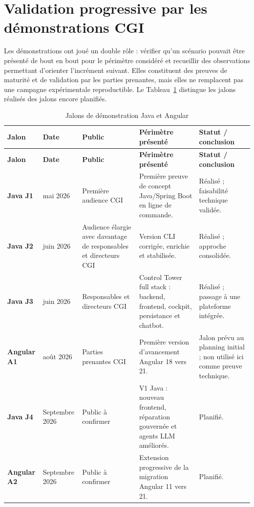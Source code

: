 \section{Validation progressive par les démonstrations CGI}

Les démonstrations ont joué un double rôle : vérifier qu'un scénario pouvait être présenté de bout en bout pour le périmètre considéré et recueillir des observations permettant d'orienter l'incrément suivant. Elles constituent des preuves de maturité et de validation par les parties prenantes, mais elles ne remplacent pas une campagne expérimentale reproductible. Le Tableau~\ref{tab:demonstrations-ch5} distingue les jalons réalisés des jalons encore planifiés.

\scriptsize
\begin{longtable}{|>{\bfseries\RaggedRight\arraybackslash}p{2cm}|>{\centering\arraybackslash}p{2.1cm}|>{\RaggedRight\arraybackslash}p{3.6cm}|>{\RaggedRight\arraybackslash}p{4.8cm}|>{\RaggedRight\arraybackslash}p{2.7cm}|}
    \caption{Jalons de démonstration Java et Angular}\label{tab:demonstrations-ch5}\\
    \hline
    \rowcolor{cgilight!95}
    \textbf{Jalon} & \textbf{Date} & \textbf{Public} & \textbf{Périmètre présenté} & \textbf{Statut / conclusion} \\
    \hline
    \endfirsthead
    \hline
    \rowcolor{cgilight!95}
    \textbf{Jalon} & \textbf{Date} & \textbf{Public} & \textbf{Périmètre présenté} & \textbf{Statut / conclusion} \\
    \hline
    \endhead
    Java J1 & 25 mai 2026 & Première audience CGI & Première preuve de concept Java/Spring Boot en ligne de commande. & Réalisé ; faisabilité technique validée. \\
    \hline
    Java J2 & 3 juin 2026 & Audience élargie avec davantage de responsables et directeurs CGI & Version CLI corrigée, enrichie et stabilisée. & Réalisé ; approche consolidée. \\
    \hline
    Java J3 & 19 juin 2026 & Responsables et directeurs CGI & Control Tower full stack : backend, frontend, cockpit, persistance et chatbot. & Réalisé ; passage à une plateforme intégrée. \\
    \hline
    Angular A1 & 11 août 2026 & Parties prenantes CGI & Première version d'avancement Angular 18 vers 21. & Jalon prévu au planning initial ; non utilisé ici comme preuve technique. \\
    \hline
    Java J4 & Septembre 2026 & Public à confirmer & V1 Java : nouveau frontend, réparation gouvernée et agents LLM améliorés. & Planifié. \\
    \hline
    Angular A2 & Septembre 2026 & Public à confirmer & Extension progressive de la migration Angular 11 vers 21. & Planifié. \\
    \hline
\end{longtable}
\normalsize

